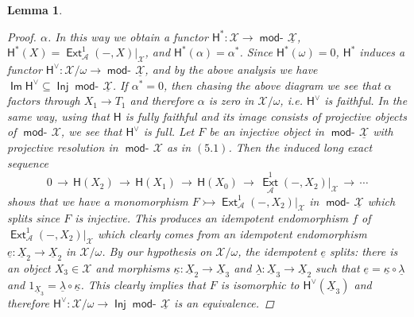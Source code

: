 \documentclass[oneside, a4paper,reqno]{amsart}
\numberwithin{equation}{section}
\newtheorem{lem}[thm]{Lemma}
\theoremstyle{definition}
\begin{document}
\begin{lem}
\begin{proof}
$\alpha$. In this way we obtain a functor $\mathsf{H}^{*} : {\mathcal X} {\longrightarrow}
\operatorname*{\mathsf{mod}-\!}\underline{\mathcal X}$, $\mathsf{H}^{*}(X) =
\operatorname*{\mathsf{Ext}}^{1}_{\mathscr A}(-,X)|_{\mathcal X}$, and $\mathsf{H}^{*}(\alpha)= \alpha^{*}$.
Since $\mathsf{H}^{*}(\omega) = 0$, $\mathsf{H}^{*}$ induces a
functor $\mathsf{H}^{\vee} : {\mathcal X}/\omega {\longrightarrow} \operatorname*{\mathsf{mod}-\!}\underline{\mathcal X}$,
and by the above analysis we have $\operatorname*{\mathsf{Im}}\mathsf{H}^{\vee} \subseteq
\operatorname*{\mathsf{Inj}}\operatorname*{\mathsf{mod}-\!}\underline{\mathcal X}$.  If $\alpha^{*} = 0$, then chasing the
above diagram we see that $\alpha$ factors through $X_{1} {\longrightarrow}
T_{1}$ and therefore $\alpha$ is zero in ${\mathcal X}/\omega$, i.e.
$\mathsf{H}^{\vee}$ is faithful. In the same way, using that
$\mathsf{H}$ is fully faithful and its image consists of projective
objects of $\operatorname*{\mathsf{mod}-\!}{\mathcal X}$, we see that $\mathsf{H}^{\vee}$ is full. Let
$F$ be an injective object in $\operatorname*{\mathsf{mod}-\!}\underline{\mathcal X}$ with projective
resolution in $\operatorname*{\mathsf{mod}-\!}{\mathcal X}$ as in $(5.1)$.  Then the induced long exact
sequence
\[
0 \, {\longrightarrow} \, \mathsf{H}(X_{2}) \, {\longrightarrow} \, \mathsf{H}(X_{1}) \, {\longrightarrow} \,
\mathsf{H}(X_{0}) \, {\longrightarrow} \, \operatorname*{\mathsf{Ext}}^{1}_{\mathscr A}(-,X_{2})|_{\mathcal X} \, {\longrightarrow} \, \cdots
\]
shows that we have a monomorphism $F {\rightarrowtail}
\operatorname*{\mathsf{Ext}}^{1}_{\mathscr A}(-,X_{2})|_{\mathcal X}$ in $\operatorname*{\mathsf{mod}-\!}\underline{\mathcal X}$ which splits
since $F$ is injective. This produces an idempotent endomorphism $f$
of $\operatorname*{\mathsf{Ext}}^{1}_{\mathscr A}(-,X_{2})|_{\mathcal X}$ which clearly comes from an
idempotent endomorphism $\underline{e} : {\underline X}_{2} {\longrightarrow} {\underline X}_{2}$ in
${\mathcal X}/\omega$. By our hypothesis on ${\mathcal X}/\omega$, the idempotent
$\underline{e}$ splits: there is an object $X_{3} \in {\mathcal X}$ and
morphisms $\underline{\kappa} : \underline{X}_{2} {\longrightarrow}
\underline{X}_{3}$ and $\underline{\lambda} : \underline{X}_{3} {\longrightarrow}
\underline{X}_{2}$ such that $\underline{e} = \underline{\kappa}
\circ \underline{\lambda}$ and $1_{\underline{X}_{3}}  =
\underline{\lambda} \circ \underline{\kappa}$. This clearly implies
that $F$ is isomorphic to $\mathsf{H}^{\vee}(\underline{X}_{3})$ and
therefore $\mathsf{H}^{\vee} : {\mathcal X}/\omega {\longrightarrow}
\operatorname*{\mathsf{Inj}}\operatorname*{\mathsf{mod}-\!}\underline{\mathcal X}$ is an equivalence.
\end{proof}
\end{lem}
\end{document}
